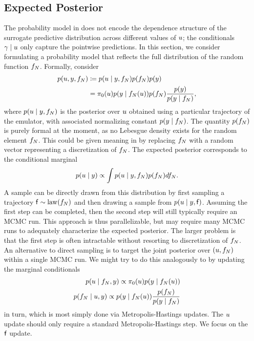 \documentclass[12pt]{article}
\begin{document}
\subsection{Expected Posterior}
The probability model in  does not encode the dependence structure of the 
surrogate predictive distribution across different values of $u$; the conditionals $\gamma \mid u$
only capture the pointwise predictions. In this section, we consider formulating a probability model that 
reflects the full distribution of the random function $f_{N}$. Formally, consider
\begin{align}
p(u, y, f_{N}) &\coloneqq
p(u \mid y, f_{N}) p(f_{N}) p(y) \\
&= \pi_0(u) p(y \mid f_{N}(u))p(f_{N}) \frac{p(y)}{p(y \mid f_{N})}, \label{eq:EP-prob-model}
\end{align}
where $p(u \mid y, f_{N})$ is the posterior over $u$ obtained using a particular 
trajectory of the emulator, with associated normalizing constant $p(y \mid f_{N})$.
The quantity $p(f_{N})$ is purely formal at the moment, as no Lebesgue 
density exists for the random element $f_{N}$. This could be given meaning in 
by replacing $f_{N}$ with a random vector representing a discretization of $f_{N}$. The expected 
posterior corresponds to the conditional marginal
\begin{align}
p(u \mid y) \propto \int p(u \mid y, f_{N}) p(f_{N}) df_{N}.
\label{eq:EP-marginal}
\end{align}
A sample can be directly drawn from this distribution by first sampling a trajectory $\mathsf{f} \sim \mathrm{law}(f_{N})$
and then drawing a sample from $p(u \mid y, \mathsf{f})$. Assuming the first step can be completed, 
then the second step will still typically require an MCMC run. This approach is thus parallelizable, but 
may require many MCMC runs to adequately characterize the expected posterior. The larger problem is 
that the first step is often intractable without resorting to discretization of $f_{N}$. An alternative to direct
sampling is to target the joint posterior over $(u, f_{N})$ within a single MCMC run. We might try to 
do this analogously to  by updating the marginal conditionals 
\begin{align}
p(u \mid f_{N}, y) \propto \pi_0(u) p(y \mid f_{N}(u)) \label{eq:EP-conditionals} \\
p(f_{N} \mid u, y) \propto p(y \mid f_{N}(u)) \frac{p(f_{N})}{p(y \mid f_{N})}
\end{align}
in turn, which is most simply done via Metropolis-Hastings updates.
The $u$ update should only require a standard Metropolis-Hastings step. We focus on the
$\mathsf{f}$ update.
\end{document}
